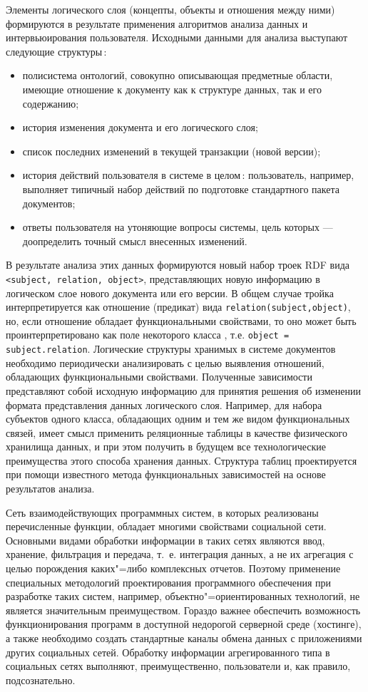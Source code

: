 \documentclass[utf8]{../IncArticle}
\begin{document}
Элементы логического слоя (концепты, объекты и отношения между ними)
формируются в результате применения алгоритмов анализа данных и
интервьюирования пользователя.  Исходными данными для анализа
выступают следующие структуры\,:
\begin{itemize}
\item полисистема онтологий, совокупно описывающая предметные области,
  имеющие отношение к документу как к структуре данных, так и его
  содержанию;
\item история изменения документа и его логического слоя;
\item список последних изменений в текущей транзакции (новой версии);
\item история действий пользователя в системе в целом\,: пользователь,
  например, выполняет типичный набор действий по подготовке
  стандартного пакета документов;
\item ответы пользователя на утоняющие вопросы системы, цель которых
  --- доопределить точный смысл внесенных изменений.
\end{itemize}

В результате анализа этих данных формируются новый набор троек RDF
вида \texttt{<subject, relation, object>}, представляющих новую
информацию в логическом слое нового документа или его версии.  В общем
случае тройка интерпретируется как отношение (предикат) вида
\texttt{relation(subject,object)}, но, если отношение обладает
функциональными свойствами, то оно может быть проинтерпретировано как
поле некоторого класса \cite{kazakovdiss}, т.е.  \texttt{object =
  subject.relation}.  Логические структуры хранимых в системе
документов необходимо периодически анализировать с целью выявления
отношений, обладающих функциональными свойствами.  Полученные
зависимости представляют собой исходную информацию для принятия
решения об изменении формата представления данных логического слоя.
Например, для набора субъектов одного класса, обладающих одним и тем
же видом функциональных связей, имеет смысл применить реляционные таблицы
в качестве физического хранилища данных, и при этом получить в будущем все
технологические преимущества этого способа хранения данных.  Структура
таблиц проектируется при помощи известного метода функциональных
зависимостей на основе результатов анализа.

Сеть взаимодействующих программных систем, в которых реализованы
перечисленные функции, обладает многими свойствами социальной сети.
Основными видами обработки информации в таких сетях являются ввод,
хранение, фильтрация и передача, т.~е. интеграция данных, а не их
агрегация с целью порождения каких"=либо комплексных отчетов.  Поэтому
применение специальных методологий проектирования программного
обеспечения при разработке таких систем, например,
объектно"=ориентированных технологий, не является значительным
преимуществом.  Гораздо важнее обеспечить возможность функционирования
программ в доступной недорогой серверной среде (хостинге), а также
необходимо создать стандартные каналы обмена данных с приложениями
других социальных сетей.  Обработку информации агрегированного типа в
социальных сетях выполняют, преимущественно, пользователи и, как
правило, подсознательно.
\end{document}
